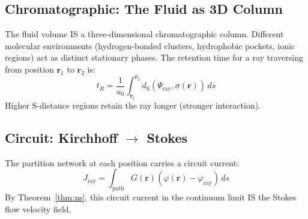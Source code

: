 \documentclass[twocolumn,10pt,a4paper]{article}
\theoremstyle{plain}
\theoremstyle{definition}
\theoremstyle{remark}
\newcommand{\dS}{d_{\mathrm{S}}}
\begin{document}
\subsection{Chromatographic: The Fluid as 3D Column}

The fluid volume IS a three-dimensional chromatographic column. Different molecular environments (hydrogen-bonded clusters, hydrophobic pockets, ionic regions) act as distinct stationary phases. The retention time for a ray traversing from position $\mathbf{r}_1$ to $\mathbf{r}_2$ is:
\begin{equation}
    t_R = \frac{1}{u_0}\int_{\mathbf{r}_1}^{\mathbf{r}_2} \dS(\Psi_{\mathrm{ray}}, \sigma(\mathbf{r}))\, ds
\end{equation}
Higher S-distance regions retain the ray longer (stronger interaction).

\subsection{Circuit: Kirchhoff $\to$ Stokes}

The partition network at each position carries a circuit current:
\begin{equation}
    J_{\mathrm{ray}} = \int_{\mathrm{path}} G(\mathbf{r})(\varphi(\mathbf{r}) - \varphi_{\mathrm{ray}})\, ds
\end{equation}
By Theorem~\ref{thm:ns}, this circuit current in the continuum limit IS the Stokes flow velocity field.
\end{document}
